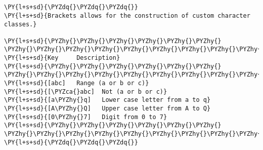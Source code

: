

\section*{}

\begin{Verbatim}[commandchars=\\\{\}]
\PY{l+s+sd}{\PYZdq{}\PYZdq{}\PYZdq{}}
\PY{l+s+sd}{Brackets allows for the construction of custom character classes.}

\PY{l+s+sd}{\PYZhy{}\PYZhy{}\PYZhy{}\PYZhy{}\PYZhy{}\PYZhy{}  \PYZhy{}\PYZhy{}\PYZhy{}\PYZhy{}\PYZhy{}\PYZhy{}\PYZhy{}\PYZhy{}\PYZhy{}\PYZhy{}\PYZhy{}\PYZhy{}\PYZhy{}\PYZhy{}\PYZhy{}\PYZhy{}\PYZhy{}\PYZhy{}\PYZhy{}\PYZhy{}\PYZhy{}\PYZhy{}\PYZhy{}\PYZhy{}\PYZhy{}\PYZhy{}\PYZhy{}\PYZhy{}\PYZhy{}}
\PY{l+s+sd}{Key     Description}
\PY{l+s+sd}{\PYZhy{}\PYZhy{}\PYZhy{}\PYZhy{}\PYZhy{}\PYZhy{}  \PYZhy{}\PYZhy{}\PYZhy{}\PYZhy{}\PYZhy{}\PYZhy{}\PYZhy{}\PYZhy{}\PYZhy{}\PYZhy{}\PYZhy{}\PYZhy{}\PYZhy{}\PYZhy{}\PYZhy{}\PYZhy{}\PYZhy{}\PYZhy{}\PYZhy{}\PYZhy{}\PYZhy{}\PYZhy{}\PYZhy{}\PYZhy{}\PYZhy{}\PYZhy{}\PYZhy{}\PYZhy{}\PYZhy{}}
\PY{l+s+sd}{[abc]   Range (a or b or c)}
\PY{l+s+sd}{[\PYZca{}abc]  Not (a or b or c)}
\PY{l+s+sd}{[a\PYZhy{}q]   Lower case letter from a to q}
\PY{l+s+sd}{[A\PYZhy{}Q]   Upper case letter from A to Q}
\PY{l+s+sd}{[0\PYZhy{}7]   Digit from 0 to 7}
\PY{l+s+sd}{\PYZhy{}\PYZhy{}\PYZhy{}\PYZhy{}\PYZhy{}\PYZhy{}  \PYZhy{}\PYZhy{}\PYZhy{}\PYZhy{}\PYZhy{}\PYZhy{}\PYZhy{}\PYZhy{}\PYZhy{}\PYZhy{}\PYZhy{}\PYZhy{}\PYZhy{}\PYZhy{}\PYZhy{}\PYZhy{}\PYZhy{}\PYZhy{}\PYZhy{}\PYZhy{}\PYZhy{}\PYZhy{}\PYZhy{}\PYZhy{}\PYZhy{}\PYZhy{}\PYZhy{}\PYZhy{}\PYZhy{}}
\PY{l+s+sd}{\PYZdq{}\PYZdq{}\PYZdq{}}
\end{Verbatim}

